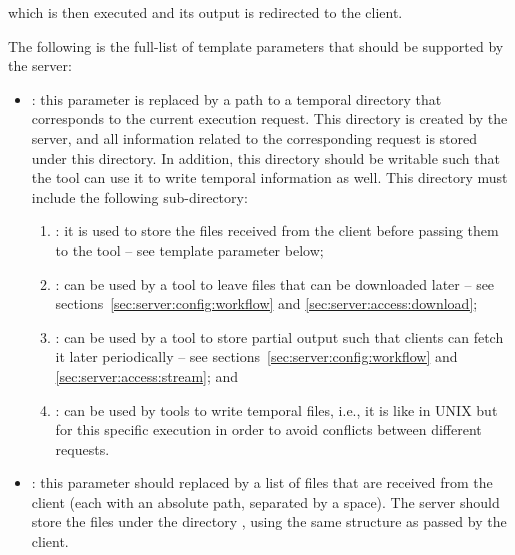 \medskip 
\noindent
which is then executed and its output is redirected to the client.

The following is the full-list of template parameters that should be
supported by the server:

\begin{itemize}
\item {}: this parameter is replaced by a
  path to a temporal directory that corresponds to the current
  execution request. This directory is created by the server, and all
  information related to the corresponding request is stored under
  this directory. In addition, this directory should be writable such
  that the tool can use it to write temporal information as well. This
  directory must include the following sub-directory:
%
  \begin{enumerate}
%
  \item {}: it is used to store the files
    received from the client before passing them to the tool -- see
    template parameter  below;
%
  \item {}: can be used by a tool to leave
    files that can be downloaded later -- see
    sections~\ref{sec:server:config:workflow} and
    \ref{sec:server:access:download};
%
  \item {}: can be used by a tool to store
    partial output such that clients can fetch it later periodically
    -- see sections~\ref{sec:server:config:workflow} and
    \ref{sec:server:access:stream}; and
%
  \item {}: can be used by tools to write
    temporal files, i.e., it is like  in UNIX but for this
    specific execution in order to avoid conflicts between different
    requests.
%
  \end{enumerate}

\item {}: this parameter should replaced by
  a list of files that are received from the client (each with an
  absolute path, separated by a space). The server should store the
  files under the directory
  , using the
  same structure as passed by the client.



\end{itemize}

